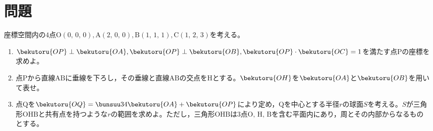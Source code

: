 \documentclass[../../../doc/main]{subfiles}
\begin{document}
    \setcounter{chapter}{4}
    \setcounter{section}{1}
    \section{問題}\label{問題4}
        \begin{tcolorbox}
            座標空間内の$4$点$\mathrm O(0,\,0,\,0),\mathrm A(2,\,0,\,0),\mathrm B(1,\,1,\,1),\mathrm C(1,\,2,\,3)$を考える。
            \begin{enumerate}
                \item [\kakkoichi]
                $\bekutoru{OP}\perp\bekutoru{OA},\bekutoru{OP}\perp\bekutoru{OB},\bekutoru{OP}\cdot\bekutoru{OC}=1$を満たす点$\mathrm P$の座標を求めよ。
                \item [\kakkoni]
                点$\mathrm P$から直線$\mathrm{AB}$に垂線を下ろし，その垂線と直線$\mathrm{AB}$の交点を$\mathrm H$とする。$\bekutoru{OH}$を$\bekutoru{OA}$と$\bekutoru{OB}$を用いて表せ。
                \item [\kakkosan]
                点$\mathrm Q$を$\bekutoru{OQ}=\bunsuu34\bekutoru{OA}+\bekutoru{OP}$により定め，$\mathrm Q$を中心とする半径$r$の球面$S$を考える。$S$が三角形$\mathrm{OHB}$と共有点を持つような$r$の範囲を求めよ。ただし，三角形$\mathrm{OHB}$は$3$点$\mathrm O,\,\mathrm H,\,\mathrm B$を含む平面内にあり，周とその内部からなるものとする。
            \end{enumerate}
        \end{tcolorbox}
\end{document}
